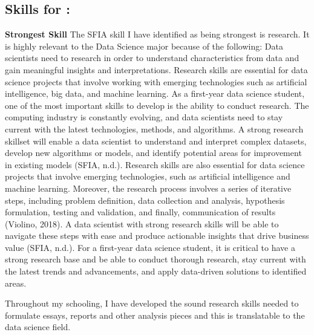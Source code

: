 \documentclass[a4paper, 11pt]{report}
\begin{document}
\subsection{Skills for \majB: \studB}
\textbf{Strongest Skill}
\newline The SFIA skill I have identified as being strongest is research. It is highly relevant to the Data Science major because of the following: Data scientists need to research in order to understand characteristics from data and gain meaningful insights and interpretations. Research skills are essential for data science projects that involve working with emerging technologies such as artificial intelligence, big data, and machine learning. As a first-year data science student, one of the most important skills to develop is the ability to conduct research. The computing industry is constantly evolving, and data scientists need to stay current with the latest technologies, methods, and algorithms. 
\newline 
A strong research skillset will enable a data scientist to understand and interpret complex datasets, develop new algorithms or models, and identify potential areas for improvement in existing models (SFIA, n.d.). Research skills are also essential for data science projects that involve emerging technologies, such as artificial intelligence and machine learning.
\newline Moreover, the research process involves a series of iterative steps, including problem definition, data collection and analysis, hypothesis formulation, testing and validation, and finally, communication of results (Violino, 2018). A data scientist with strong research skills will be able to navigate these steps with ease and produce actionable insights that drive business value (SFIA, n.d.).
For a first-year data science student, it is critical to have a strong research base and be able to conduct thorough research, stay current with the latest trends and advancements, and apply data-driven solutions to identified areas.

Throughout my schooling, I have developed the sound research skills needed to formulate essays, reports and other analysis pieces and this is translatable to the data science field. 
\end{document}
